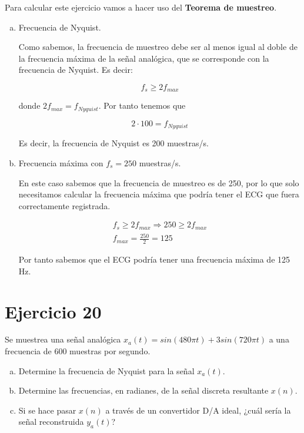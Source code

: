 \documentclass[11pt,a4paper]{article}
\begin{document}
Para calcular este ejercicio vamos a hacer uso del \textbf{Teorema de muestreo}.

\begin{enumerate}[a)]
	\item Frecuencia de Nyquist.

	Como sabemos, la frecuencia de muestreo debe ser al menos igual al doble de la frecuencia máxima de la señal analógica, que se corresponde con la frecuencia de Nyquist. Es decir:
	
	\[f_s \geq 2f_{max}\]
	
	donde $2f_{max} = f_{Nyquist}$. Por tanto tenemos que
	
	\[2\cdot 100 = f_{Nyquist}\]
	
	Es decir, la frecuencia de Nyquist es 200 muestras/s.
		
	\item Frecuencia máxima con $f_s = 250$ muestras/s.
	
	En este caso sabemos que la frecuencia de muestreo es de 250, por lo que solo necesitamos calcular la frecuencia máxima que podría tener el ECG que fuera correctamente registrada.
	
	\begin{gather*}
	f_s \geq 2f_{max} \Rightarrow 250 \geq 2f_{max}\\
	f_{max} = \frac{250}{2} = 125
	\end{gather*}
	
	Por tanto sabemos que el ECG podría tener una frecuencia máxima de 125 Hz.
\end{enumerate}

\newpage

\section{Ejercicio 20}

Se muestrea una señal analógica $x_a(t) = sin(480\pi t) + 3sin(720\pi t)$ a una frecuencia de 600 muestras por segundo.
\begin{enumerate}[a)]
	\item Determine la frecuencia de Nyquist para la señal $x_a(t)$.
	\item Determine las frecuencias, en radianes, de la señal discreta resultante $x(n)$.
	\item Si se hace pasar $x(n)$ a través de un convertidor D/A ideal, ¿cuál sería la señal reconstruida $y_a(t)$?\\
\end{enumerate}
\end{document}
